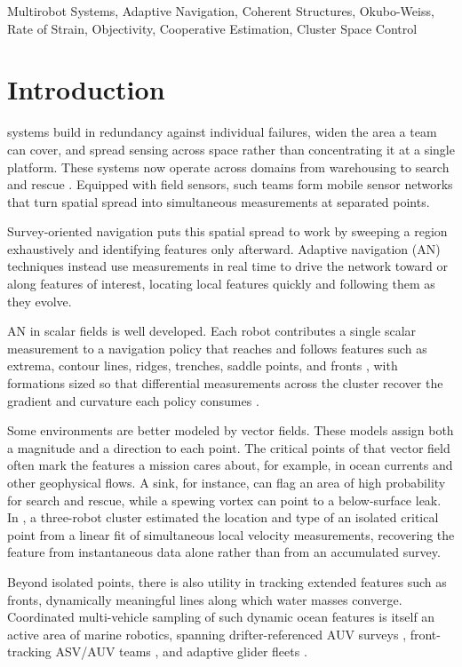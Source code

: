 \documentclass[lettersize,journal]{IEEEtran}
\begin{document}
\begin{IEEEkeywords}
Multirobot Systems, Adaptive Navigation, Coherent Structures,
Okubo-Weiss, Rate of Strain, Objectivity, Cooperative
Estimation, Cluster Space Control
\end{IEEEkeywords}

\section{Introduction}
\label{sec:intro}

 systems build in redundancy against
individual failures, widen the area a team can cover, and spread
sensing across space rather than concentrating it at a single
platform. These systems now operate across domains from warehousing
to search and rescue \cite{1}. Equipped with field sensors, such
teams form mobile sensor networks that turn spatial spread into
simultaneous measurements at separated points.

Survey-oriented navigation puts this spatial spread to work by
sweeping a region exhaustively and identifying features only
afterward. Adaptive navigation (AN) techniques instead use
measurements in real time to drive the network toward or along
features of interest, locating local features quickly and following
them as they evolve.

AN in scalar fields is well developed. Each robot contributes a single
scalar measurement to a navigation policy that reaches and follows
features such as extrema, contour lines, ridges, trenches, saddle
points, and fronts \cite{26,27,28,29}, with formations sized so that
differential measurements across the cluster recover the gradient and
curvature each policy consumes \cite{15,26}.

Some environments are better modeled by vector fields. These models
assign both a magnitude and a direction to each point. The critical
points of that vector field often mark the features a mission cares
about, for example, in ocean currents and other geophysical flows. A
sink, for instance, can flag an area of high probability for search
and rescue, while a spewing vortex can point to a below-surface leak.
In \cite{14}, a three-robot cluster estimated the location and type of
an isolated critical point from a linear fit of simultaneous local
velocity measurements, recovering the feature from instantaneous data
alone rather than from an accumulated survey.

Beyond isolated points, there is also utility in tracking extended
features such as fronts, dynamically meaningful lines along which
water masses converge. Coordinated multi-vehicle sampling of such
dynamic ocean features is itself an active area of marine robotics,
spanning drifter-referenced AUV surveys \cite{2}, front-tracking
ASV/AUV teams \cite{3}, and adaptive glider fleets \cite{4}.
\end{document}
